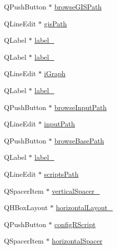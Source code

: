 \begin{DoxyCompactItemize}
\item 
Q\+Push\+Button $\ast$ \mbox{\hyperlink{class_ui___vessel_editor_main_window_a0c3d3a40d867e51e86525244a963ce58}{browse\+G\+I\+S\+Path}}
\item 
Q\+Line\+Edit $\ast$ \mbox{\hyperlink{class_ui___vessel_editor_main_window_a40ec4f1bb420cef04866828416655f0d}{gis\+Path}}
\item 
Q\+Label $\ast$ \mbox{\hyperlink{class_ui___vessel_editor_main_window_a6100d9f8953ff9b02f1679bf041bb46f}{label\+\_}}
\item 
Q\+Label $\ast$ \mbox{\hyperlink{class_ui___vessel_editor_main_window_af2820ccaf84772cdfd3a39f5119dbebb}{label\+\_}}
\item 
Q\+Line\+Edit $\ast$ \mbox{\hyperlink{class_ui___vessel_editor_main_window_addfcd2332257139d61cea88b4ceaf431}{i\+Graph}}
\item 
Q\+Label $\ast$ \mbox{\hyperlink{class_ui___vessel_editor_main_window_af07245e7c6e2cd5ccf44326f17edc4ec}{label\+\_}}
\item 
Q\+Push\+Button $\ast$ \mbox{\hyperlink{class_ui___vessel_editor_main_window_a4fe4c2ffeb662769d843062e9726c173}{browse\+Input\+Path}}
\item 
Q\+Line\+Edit $\ast$ \mbox{\hyperlink{class_ui___vessel_editor_main_window_ad61b978257aa51df1a4ef315cc5e31f8}{input\+Path}}
\item 
Q\+Push\+Button $\ast$ \mbox{\hyperlink{class_ui___vessel_editor_main_window_ac19a875ccef8320b94a38b1a5ac7b2b7}{browse\+Base\+Path}}
\item 
Q\+Label $\ast$ \mbox{\hyperlink{class_ui___vessel_editor_main_window_a0d1394c1b8034a8ed54657ee89dcc49b}{label\+\_}}
\item 
Q\+Line\+Edit $\ast$ \mbox{\hyperlink{class_ui___vessel_editor_main_window_a677a69024f79dd8d49d0d1ed044b4b7b}{scripts\+Path}}
\item 
Q\+Spacer\+Item $\ast$ \mbox{\hyperlink{class_ui___vessel_editor_main_window_ad118849c154fdefeafb7db368a249786}{vertical\+Spacer\+\_}}
\item 
Q\+H\+Box\+Layout $\ast$ \mbox{\hyperlink{class_ui___vessel_editor_main_window_a0ea821d6c2b8ae61f6af04c515c5320b}{horizontal\+Layout\+\_}}
\item 
Q\+Push\+Button $\ast$ \mbox{\hyperlink{class_ui___vessel_editor_main_window_a13132b5bb90db9fb9b093431bccbcdda}{config\+R\+Script}}
\item 
Q\+Spacer\+Item $\ast$ \mbox{\hyperlink{class_ui___vessel_editor_main_window_a09a3523fa8ce09c4fc58c2c498976336}{horizontal\+Spacer}}

\end{DoxyCompactItemize}
